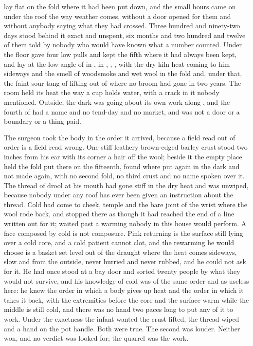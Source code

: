 
 lay flat on the fold where it had been put down, and the small hours came on under the roof the way weather comes, without a door opened for them and without anybody saying what they had crossed. Three hundred and ninety-two days stood behind it exact and unspent, six months and two hundred and twelve of them told by nobody who would have known what a number counted. Under the floor  gave four low pulls and kept the fifth where it had always been kept, and  lay at the low angle of  in , in , , , with the dry kiln heat coming to him sideways and the smell of woodsmoke and wet wool in the fold and, under that, the faint sour tang of  lifting out of  where no broom had gone in two years. The room held its heat the way a cup holds water, with a crack in it nobody mentioned. Outside, the dark was going about its own work along , and the fourth of  had a name and no tend-day and no market, and was not a door or a boundary or a thing paid.

The surgeon took the body in the order it arrived, because a field read out of order is a field read wrong. One stiff leathery brown-edged barley crust stood two inches from his ear with its corner a hair off the wool; beside it the empty place held the fold put there on the fifteenth, found where put again in the dark and not made again, with no second fold, no third crust and no name spoken over it. The thread of drool at his mouth had gone stiff in the dry heat and was unwiped, because nobody under any roof has ever been given an instruction about the thread. Cold had come to cheek, temple and the bare joint of the wrist where the wool rode back, and stopped there as though it had reached the end of a line written out for it;  waited past a warming nobody in this house would perform. A face composed by cold is not composure. Pink returning is the surface still lying over a cold core, and a cold patient cannot clot, and the rewarming he would choose is a basket set level out of the draught where the heat comes sideways, slow and from the outside, never hurried and never rubbed, and he could not ask for it. He had once stood at a bay door and sorted twenty people by what they would not survive, and his knowledge of cold was of the same order and as useless here: he knew the order in which a body gives up heat and the order in which it takes it back, with the extremities before the core and the surface warm while the middle is still cold, and there was no hand two paces long to put any of it to work. Under the exactness the infant wanted the crust lifted, the thread wiped and a hand on the pot handle. Both were true. The second was louder. Neither won, and no verdict was looked for; the quarrel was the work.


